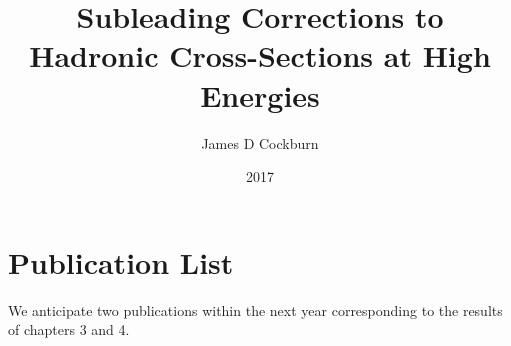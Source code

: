 \documentclass[a4paper,12pt,oneside,openright]{book}
\title{Subleading Corrections to Hadronic Cross-Sections at High Energies}
\author{James D Cockburn}
\date{2017} %
\begin{document}
\def\VSpace{10.0ex}

\singlespacing
\maketitlepage
\frontmatter
\eighteenptleading


\setcounter{page}{1}


\singlespacing
\makedeclaration
\section*{Publication List} 
We anticipate two publications within the next year corresponding to the results of chapters 3 and 4. 



\cleardoublepage
{}
\setcounter{tocdepth}{2}
\tableofcontents

\makeatletter
     \renewcommand*\l@figure{\@dottedtocline{1}{1em}{3.2em}}
\makeatother

\cleardoublepage
{}
\listoffigures

\makeatletter
     \renewcommand*\l@figure{\@dottedtocline{1}{1em}{3.2em}}
\makeatother

\cleardoublepage
{}
\listoftables


\mainmatter
\eighteenptleading
\setcounter{page}{1}






\appendix
{}
%




\backmatter

\singlespace

{}
%


\end{document}
